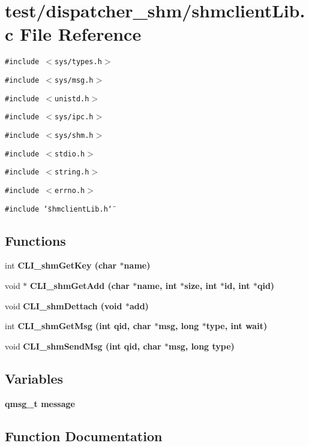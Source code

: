 \section{test/dispatcher\_\-shm/shmclient\-Lib.c File Reference}
\label{dispatcher__shm_2shmclientLib_8c}
{\tt \#include $<$sys/types.h$>$}\par
{\tt \#include $<$sys/msg.h$>$}\par
{\tt \#include $<$unistd.h$>$}\par
{\tt \#include $<$sys/ipc.h$>$}\par
{\tt \#include $<$sys/shm.h$>$}\par
{\tt \#include $<$stdio.h$>$}\par
{\tt \#include $<$string.h$>$}\par
{\tt \#include $<$errno.h$>$}\par
{\tt \#include \char`\"{}shmclient\-Lib.h\char`\"{}}\par
\subsection*{Functions}
\begin{CompactItemize}
\item 
int \bf{CLI\_\-shm\-Get\-Key} (char $\ast$name)
\item 
void $\ast$ \bf{CLI\_\-shm\-Get\-Add} (char $\ast$name, int $\ast$size, int $\ast$id, int $\ast$qid)
\item 
void \bf{CLI\_\-shm\-Dettach} (void $\ast$add)
\item 
int \bf{CLI\_\-shm\-Get\-Msg} (int qid, char $\ast$msg, long $\ast$type, int wait)
\item 
void \bf{CLI\_\-shm\-Send\-Msg} (int qid, char $\ast$msg, long type)
\end{CompactItemize}
\subsection*{Variables}
\begin{CompactItemize}
\item 
\bf{qmsg\_\-t} \bf{message}
\end{CompactItemize}


\subsection{Function Documentation}
